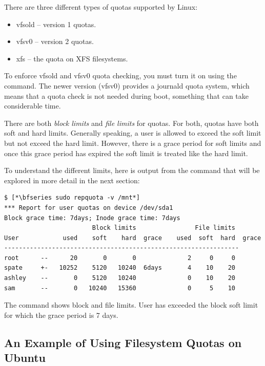 There are three different types of quotas supported by Linux:

\begin{itemize}
	\item vfsold -- version 1 quotas.
	\item vfsv0 -- version 2 quotas.
	\item xfs -- the quota on XFS filesystems.
\end{itemize}

\noindent
To enforce vfsold and vfsv0 quota checking, you must turn it on using the  command. The newer version (vfsv0) provides a journald quota system, which means that a quota check is not needed during boot, something that can take considerable time.

There are both \textit{block limits} and \textit{file limits} for quotas. For both, quotas have both soft and hard limits. Generally speaking, a user is allowed to exceed the soft limit but not exceed the hard limit. However, there is a grace period for soft limits and once this grace period has expired the soft limit is treated like the hard limit.

To understand the different limits, here is output from the  command that will be explored in more detail in the next section:

\begin{lstlisting}
$ [*\bfseries sudo repquota -v /mnt*]
*** Report for user quotas on device /dev/sda1
Block grace time: 7days; Inode grace time: 7days
                        Block limits                File limits
User            used    soft    hard  grace    used  soft  hard  grace
----------------------------------------------------------------
root      --      20       0       0              2     0     0       
spate     +-   10252    5120   10240  6days       4    10    20       
ashley    --       0    5120   10240              0    10    20       
sam       --       0   10240   15360              0     5    10     
\end{lstlisting}

\noindent
The command shows block and file limits. User  has exceeded the block soft limit for which the grace period is 7 days.

\subsection{An Example of Using Filesystem Quotas on Ubuntu}


